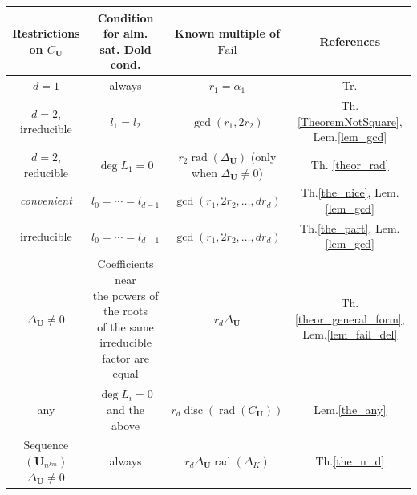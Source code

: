 \documentclass[preprint,12pt]{elsarticle}
\newcommand{\nice}{\textit{convenient} }
\DeclareMathOperator{\rad}{rad}
\DeclareMathOperator{\fail}{Fail}
\DeclareMathOperator{\disc}{disc}
\begin{document}
\begin{center}
\begin{tabular}{||c || c | c | c ||} 
\hline
    Restrictions on $C_\mathbf{U}$ & 
    \makecell{Condition for alm. \\sat. Dold cond.} & 
    Known multiple of $\fail$ & 
    References  \\ 
\hline\hline
    $d=1$ & 
    always & 
    $r_1 = \alpha_1$ & 
    Tr. \\
\hline
    $d=2$, irreducible & 
    $l_1=l_2$ & 
    $\gcd\left(r_1,2r_2\right)$ & 
    Th.\ref{TheoremNotSquare}, Lem.\ref{lem_gcd}\\
\hline
    $d=2$, reducible & 
    $\deg L_1=0 $ & 
    \makecell{$r_2\rad(\Delta_\mathbf{U})$ \\ (only when $\Delta_\mathbf{U}\not=0$)} & 
    Th. \ref{theor_rad} \\
\hline
    \nice & 
    $l_0=\cdots=l_{d-1}$ & 
    $\gcd\left(r_1,2r_2, \ldots, dr_d \right)$ & 
    Th.\ref{the_nice}, Lem.\ref{lem_gcd}\\
\hline
    irreducible & 
    $l_0=\cdots=l_{d-1}$ & 
    $\gcd\left(r_1,2r_2, \ldots, dr_d \right)$  & 
    Th.\ref{the_part}, Lem.\ref{lem_gcd}\\
\hline
    $\Delta_\mathbf{U}\not=0$  & 
    \makecell{Coefficients near\\ the powers of the roots\\ of the same  irreducible \\factor are equal}  &
    $r_d\Delta_\mathbf{U} $ & 
    Th.\ref{theor_general_form}, Lem.\ref{lem_fail_del}\\
\hline
    any  & 
    $\deg L_i = 0$ and  the above & 
    $r_d\disc(\rad(C_\mathbf{U}))$ & 
    Lem.\ref{the_any}\\
\hline\hline
    \makecell{Sequence $(\mathbf{U}_{n^{km}})$ \\ $\Delta_\mathbf{U} \not= 0$}  & 
    always & 
    $r_d\Delta_\mathbf{U}\rad(\Delta_K)$ & 
    Th.\ref{the_n_d}\\
\hline\hline
\end{tabular}


\end{center}
\end{document}
